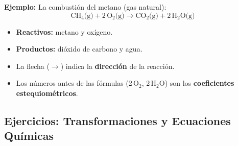 \documentclass[12pt, a4paper]{article}
\begin{document}
\noindent\textbf{Ejemplo:} La combustión del metano (gas natural):
$$\text{CH}_4\text{(g)} + 2\,\text{O}_2\text{(g)} \rightarrow \text{CO}_2\text{(g)} + 2\,\text{H}_2\text{O(g)}$$
\begin{itemize}
  \item \textbf{Reactivos:} metano y oxígeno.
  \item \textbf{Productos:} dióxido de carbono y agua.
  \item La flecha ($\rightarrow$) indica la \textbf{dirección} de la reacción.
  \item Los números antes de las fórmulas (2\,O$_2$, 2\,H$_2$O) son los \textbf{coeficientes estequiométricos}.
\end{itemize}

\newpage

\subsection{Ejercicios: Transformaciones y Ecuaciones Químicas}
\end{document}
